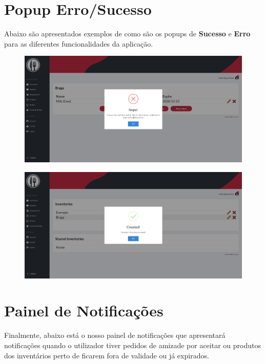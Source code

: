\documentclass[a4paper]{report}
\begin{document}
    \section{Popup Erro/Sucesso}

    Abaixo são apresentados exemplos de como são os popups de \textbf{Sucesso} 
    e \textbf{Erro} para as diferentes funcionalidades da aplicação.

    \begin{figure}[H]
        \centering
            \includegraphics[width=\textwidth]{images/produto_final/exemplo_erro.png}
    \end{figure}

    \begin{figure}[H]
        \centering
            \includegraphics[width=\textwidth]{images/produto_final/exemplo_sucesso.png}
    \end{figure}

    \section{Painel de Notificações}

    Finalmente, abaixo está o nosso painel de notificações que apresentará
    notificações quando o utilizador tiver pedidos de amizade por aceitar
    ou produtos dos inventários perto de ficarem fora de validade ou 
    já expirados.
\end{document}
